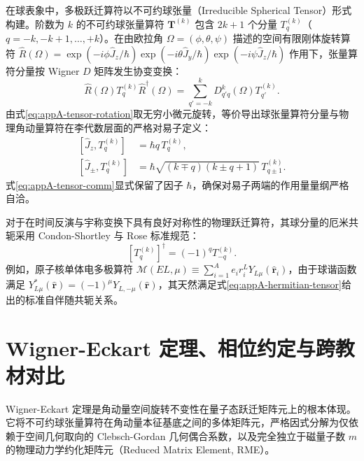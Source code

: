 在球表象中，多极跃迁算符以不可约球张量（Irreducible Spherical Tensor）形式构建。阶数为 $k$ 的不可约球张量算符 $\mathbf{T}^{(k)}$ 包含 $2k+1$ 个分量 $T_q^{(k)}$（$q = -k, -k+1, \dots, +k$）。在由欧拉角 $\Omega = (\phi, \theta, \psi)$ 描述的空间有限刚体旋转算符 $\hat{R}(\Omega) = \exp(-i \phi \hat{J}_z / \hbar) \exp(-i \theta \hat{J}_y / \hbar) \exp(-i \psi \hat{J}_z / \hbar)$ 作用下，张量算符分量按 Wigner $D$ 矩阵发生协变变换：
\begin{equation}\label{eq:appA-tensor-rotation}
\hat{R}(\Omega) T_q^{(k)} \hat{R}^\dagger(\Omega) = \sum_{q'=-k}^k D^k_{q' q}(\Omega) T_{q'}^{(k)} .
\end{equation}
由式\eqref{eq:appA-tensor-rotation}取无穷小微元旋转，等价导出球张量算符分量与物理角动量算符在李代数层面的严格对易子定义：
\begin{align}\label{eq:appA-tensor-comm}
[\hat{J}_z, T_q^{(k)}] &= \hbar q \, T_q^{(k)} , \\
[\hat{J}_\pm, T_q^{(k)}] &= \hbar \sqrt{(k \mp q)(k \pm q + 1)} \, T_{q \pm 1}^{(k)} .
\end{align}
式\eqref{eq:appA-tensor-comm}显式保留了因子 $\hbar$，确保对易子两端的作用量量纲严格自洽。

对于在时间反演与宇称变换下具有良好对称性的物理跃迁算符，其球分量的厄米共轭采用 Condon-Shortley 与 Rose 标准规范：
\begin{equation}\label{eq:appA-hermitian-tensor}
[T_q^{(k)}]^\dagger = (-1)^q T_{-q}^{(k)} .
\end{equation}
例如，原子核单体电多极算符 $\mathcal{M}(EL, \mu) \equiv \sum_{i=1}^A e_i r_i^L Y_{L\mu}(\hat{\mathbf{r}}_i)$，由于球谐函数满足 $Y_{L\mu}^*(\hat{\mathbf{r}}) = (-1)^\mu Y_{L, -\mu}(\hat{\mathbf{r}})$，其天然满足式\eqref{eq:appA-hermitian-tensor}给出的标准自伴随共轭关系。

\section{Wigner-Eckart 定理、相位约定与跨教材对比}\label{sec:appA-2}

Wigner-Eckart 定理是角动量空间旋转不变性在量子态跃迁矩阵元上的根本体现。它将不可约球张量算符在角动量本征基底之间的多体矩阵元，严格因式分解为仅依赖于空间几何取向的 Clebsch-Gordan 几何偶合系数，以及完全独立于磁量子数 $m$ 的物理动力学约化矩阵元（Reduced Matrix Element, RME）。

